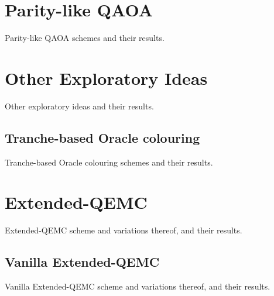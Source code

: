 \section{Parity-like QAOA}
\label{section:Parity_QAOA}

Parity-like QAOA schemes and their results.





\section{Other Exploratory Ideas}
\label{section:Exploratory_Ideas}

Other exploratory ideas and their results.





\subsection{Tranche-based Oracle colouring}
\label{section:Oracle_colouring}

Tranche-based Oracle colouring schemes and their results.





\section{Extended-QEMC}
\label{section:Extended_QEMC}

Extended-QEMC scheme and variations thereof, and their results.





\subsection{Vanilla Extended-QEMC}
\label{subsection:Vanilla_Extended_QEMC}

Vanilla Extended-QEMC scheme and variations thereof, and their results.





